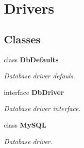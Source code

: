 \section{Drivers}
\label{group__OWL__DRIVERS}
\subsection*{Classes}
\begin{DoxyCompactItemize}
\item 
class {\bf DbDefaults}
\begin{DoxyCompactList}\small\item\em Database driver defauls. \end{DoxyCompactList}\item 
interface {\bf DbDriver}
\begin{DoxyCompactList}\small\item\em Database driver interface. \end{DoxyCompactList}\item 
class {\bf MySQL}
\begin{DoxyCompactList}\small\item\em Database driver. \end{DoxyCompactList}\end{DoxyCompactItemize}
